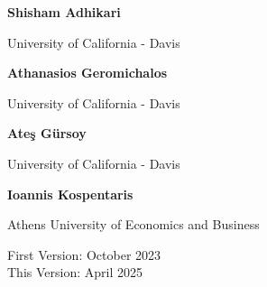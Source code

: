 \documentclass[12pt]{article} %
\theoremstyle{definition}
\begin{document}



\vspace{0.5cm}

\noindent \normalsize  \textbf{Shisham Adhikari}

\noindent University of California - Davis

\vspace{0.4cm}

\noindent \normalsize  \textbf{Athanasios Geromichalos}

\noindent University of California - Davis

\vspace{0.4cm}

\noindent  \textbf{Ate\c{s} G\"ursoy}

\noindent University of California - Davis


\vspace{0.4cm}

\noindent  \textbf{Ioannis Kospentaris}

\noindent Athens University of Economics and Business


\vspace{0.5cm}
\noindent First Version: October 2023 \\
\noindent This Version: April 2025


\vspace{0.7cm}

\normalsize
\end{document}
